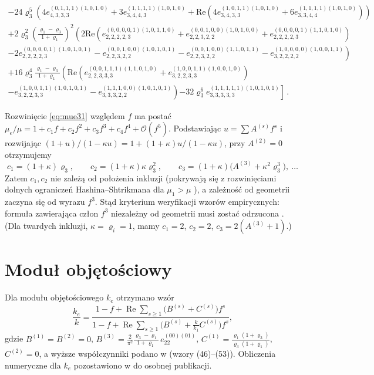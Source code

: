 \documentclass[12pt,a4paper,twoside,openright]{report}
\theoremstyle{definition}
\theoremstyle{remark}
\renewcommand{\Re}{\operatorname{Re}}
\begin{document}
\begin{multline}
-24\varrho_3^5\left(
4e_{4,3,3,3}^{(0,1,1,1)(1,0,1,0)}
+3e_{3,4,4,3}^{(1,1,1,1)(1,0,1,0)}
+\mathrm{Re}\left(4e_{3,4,3,3}^{(1,0,1,1)(1,0,1,0)}
+6e_{3,3,4,4}^{(1,1,1,1)(1,0,1,0)}\right)
\right)
\\
+2\varrho_3^2\left(\frac{\varrho_1-\varrho_3}{1+\varrho_1}\right)^2
\left(
2\mathrm{Re}\left(e_{2,2,2,2,3}^{(0,0,0,0,1)(1,0,1,1,0)}
+e_{2,2,3,2,2}^{(0,0,1,0,0)(1,0,1,0,0)}
+e_{2,2,2,2,3}^{(0,0,0,0,1)(1,1,0,1,0)}\right)
\right. \\
 	\left.
-2e_{2,2,2,2,3}^{(0,0,0,0,1)(1,0,1,0,1)}
-e_{2,2,3,2,2}^{(0,0,1,0,0)(1,0,1,0,1)}
-e_{2,2,3,2,2}^{(0,0,1,0,0)(1,1,0,1,1)}
-e_{3,2,2,2,2}^{(1,0,0,0,0)(1,0,0,1,1)}
\right)
\\
+16\varrho_3^4\frac{\varrho_1-\varrho_3}{1+\varrho_1}
\left(
\mathrm{Re}\left(e_{2,2,3,3,3}^{(0,0,1,1,1)(1,1,0,1,0)}
+e_{3,2,2,3,3}^{(1,0,0,1,1)(1,0,0,1,0)}\right)
\right. \\ 	\left.
-e_{3,2,2,3,3}^{(1,0,0,1,1)(1,0,1,0,1)}
-e_{3,3,3,2,2}^{(1,1,1,0,0)(1,0,1,0,1)}
\right)
\left.-32\varrho_3^6
e_{3,3,3,3,3}^{(1,1,1,1,1)(1,0,1,0,1)}\right]\,.
\end{multline}

Rozwinięcie \eqref{eq:mue31} względem $f$ ma postać $\mu_e/\mu=1+c_1f+c_2f^2+c_3f^3+c_4f^4+\mathcal O(f^5)$. Podstawiając $u=\sum A^{(s)}f^s$ i rozwijając $(1+u)/(1-\kappa u)=1+(1+\kappa)u/(1-\kappa u)$, przy $A^{(2)}=0$ otrzymujemy
\begin{equation}\label{eq:cs}
c_1=(1+\kappa)\varrho_3,\qquad c_2=(1+\kappa)\kappa\varrho_3^2,\qquad c_3=(1+\kappa)\bigl(A^{(3)}+\kappa^2\varrho_3^3\bigr),\ \dots
\end{equation}
Zatem $c_1,c_2$ nie zależą od położenia inkluzji (pokrywają się z rozwinięciami dolnych ograniczeń Hashina--Shtrikmana dla $\mu_1>\mu$ \cite{mityushev2025computationalpart3}), a zależność od geometrii zaczyna się od wyrazu $f^3$. Stąd kryterium weryfikacji wzorów empirycznych: formuła zawierająca człon $f^3$ niezależny od geometrii musi zostać odrzucona \cite{czapla2025computational}. (Dla twardych inkluzji, $\kappa=\varrho_i=1$, mamy $c_1=2$, $c_2=2$, $c_3=2(A^{(3)}+1)$.)

\section{Moduł objętościowy}\label{ssec:bulk}

Dla modułu objętościowego $k_e$ otrzymano wzór
\begin{equation}\label{eq:ke44}
\frac{k_e}{k}=\frac{1-f+\Re\sum_{s\ge1}\bigl(B^{(s)}+C^{(s)}\bigr)f^s}{1-f+\Re\sum_{s\ge1}\bigl(B^{(s)}+\frac{k}{k_1}C^{(s)}\bigr)f^s},
\end{equation}
gdzie $B^{(1)}=B^{(2)}=0$, $B^{(3)}=\frac{2}{\pi^2}\frac{\varrho_3-\varrho_1}{1+\varrho_1}\,e_{22}^{(00)(01)}$, $C^{(1)}=\frac{\varrho_1(1+\varrho_3)}{\varrho_3(1+\varrho_1)}$, $C^{(2)}=0$, a wyższe współczynniki podano w \cite{czapla2025computational} (wzory (46)--(53)). Obliczenia numeryczne dla $k_e$ pozostawiono w \cite{czapla2025computational} do osobnej publikacji.
\end{document}

